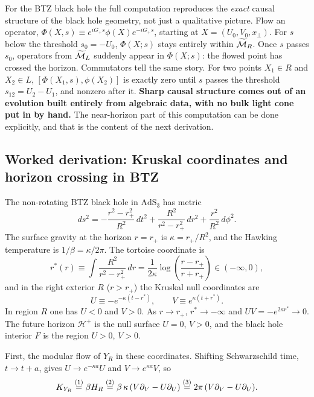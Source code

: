 For the BTZ black hole the full computation reproduces the \emph{exact} causal structure of the black hole
geometry, not just a qualitative picture. Flow an operator, $\Phi(X,s)\equiv e^{iG_+s}\phi(X)e^{-iG_+s}$,
starting at $X=(U_0,V_0,x_\perp)$. For $s$ below the threshold $s_0=-U_0$, $\Phi(X;s)$ stays entirely within
$\widetilde{\mathcal{M}}_R$. Once $s$ passes $s_0$, operators from $\widetilde{\mathcal{M}}_L$ suddenly appear in $\Phi(X;s)$: the
flowed point has crossed the horizon. Commutators tell the same story. For two points $X_1\in R$ and
$X_2\in L$, $[\Phi(X_1,s),\phi(X_2)]$ is exactly zero until $s$ passes the threshold $s_{12}=U_2-U_1$, and
nonzero after it. \textbf{Sharp causal structure comes out of an evolution built entirely from algebraic
data, with no bulk light cone put in by hand.} The near-horizon part of this computation can be done
explicitly, and that is the content of the next derivation.

\subsection*{Worked derivation: Kruskal coordinates and horizon crossing in BTZ}

The non-rotating BTZ black hole in $\text{AdS}_3$ has metric
\[
ds^2 = -\frac{r^2 - r_+^2}{R^2}\, dt^2 + \frac{R^2}{r^2 - r_+^2}\, dr^2 + \frac{r^2}{R^2}\, d\phi^2 .
\]
The surface gravity at the horizon $r = r_+$ is $\kappa = r_+/R^2$, and the Hawking temperature is
$1/\beta=\kappa/2\pi$. The tortoise coordinate is
\[
r^*(r) \equiv \int \frac{R^2}{r^2 - r_+^2}\, dr = \frac{1}{2\kappa} \log\left(\frac{r - r_+}{r + r_+}\right)
\in (-\infty, 0) ,
\]
and in the right exterior $R$ ($r > r_+$) the Kruskal null coordinates are
\[
U \equiv -e^{-\kappa(t - r^*)}, \qquad V \equiv e^{\kappa(t + r^*)} .
\]
In region $R$ one has $U<0$ and $V>0$. As $r\to r_+$, $r^*\to-\infty$ and $UV=-e^{2\kappa r^*}\to0$. The
future horizon $\mathcal H^+$ is the null surface $U=0$, $V>0$, and the black hole interior $F$ is the region
$U>0$, $V>0$.

First, the modular flow of $Y_R$ in these coordinates. Shifting Schwarzschild time, $t\to t+a$, gives
$U\to e^{-\kappa a}U$ and $V\to e^{\kappa a}V$, so
\begin{align}
K_{Y_R} \overset{(1)}{=} \beta H_R \overset{(2)}{=} \beta\,\kappa\,(V\partial_V - U\partial_U) \overset{(3)}{=}
2\pi\,(V\partial_V - U\partial_U) .
\label{eq:BTZ_boost}
\end{align}
\quad
{}\quad
{}

